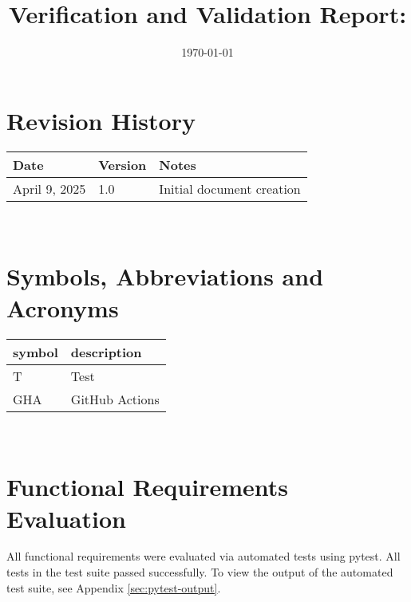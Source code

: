 \documentclass[12pt, titlepage]{article}
\begin{document}
\title{Verification and Validation Report: \progname} 
\author{\authname}
\date{\today}
	
\maketitle


\section{Revision History}

\begin{tabularx}{\textwidth}{p{3cm}p{2cm}X}
\toprule {\bf Date} & {\bf Version} & {\bf Notes}\\
\midrule
April 9, 2025 & 1.0 & Initial document creation\\
\bottomrule
\end{tabularx}

~\newpage

\section{Symbols, Abbreviations and Acronyms}

\renewcommand{\arraystretch}{1.2}
\begin{tabular}{l l} 
  \toprule		
  \textbf{symbol} & \textbf{description}\\
  \midrule 
  T & Test\\
  GHA & GitHub Actions\\
  \bottomrule
\end{tabular}\\


\newpage

\tableofcontents

\listoftables %

\listoffigures %

\newpage


\section{Functional Requirements Evaluation}

All functional requirements were evaluated via automated tests using pytest.
All tests in the test suite passed successfully. To view the output of the
automated test suite, see Appendix \ref{sec:pytest-output}.
\end{document}
